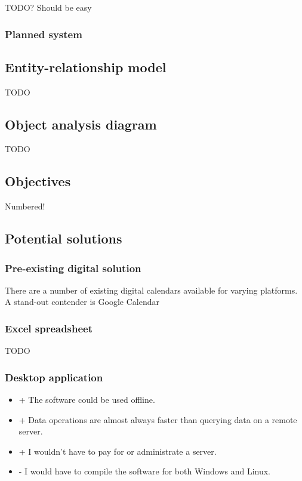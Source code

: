 
TODO? Should be easy


\subsubsection{Planned system}
\subsection{Entity-relationship model}

TODO


\subsection{Object analysis diagram}

TODO


\subsection{Objectives}

Numbered!


\subsection{Potential solutions}



\subsubsection{Pre-existing digital solution}

There are a number of existing digital calendars available for varying
platforms. A stand-out contender is Google Calendar


\subsubsection{Excel spreadsheet}

TODO


\subsubsection{Desktop application}

\begin{itemize}
  \item + The software could be used offline.
  \item + Data operations are almost always faster than querying data on a
          remote server.
  \item + I wouldn't have to pay for or administrate a server.
  \item - I would have to compile the software for both Windows and Linux.
\end{itemize}

